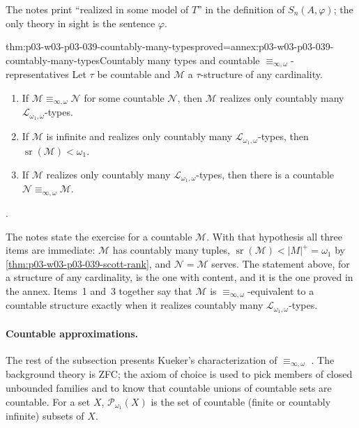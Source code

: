 The notes print ``realized in some model of \(T\)'' in the definition of
\(S_n(A,\varphi)\); the only theory in sight is the sentence \(\varphi\).

\begin{hbtheorem}{thm:p03-w03-p03-039-countably-many-types}{proved=annex:p03-w03-p03-039-countably-many-types}{Countably many types and countable \(\equiv_{\infty,\omega}\)-representatives}
Let \(\tau\) be countable and \(\mathcal M\) a \(\tau\)-structure of any
cardinality.
\begin{enumerate}
\item If \(\mathcal M\equiv_{\infty,\omega}\mathcal N\) for some countable
      \(\mathcal N\), then \(\mathcal M\) realizes only countably many
      \(\mathcal L_{\omega_1,\omega}\)-types.
\item If \(\mathcal M\) is infinite and realizes only countably many
      \(\mathcal L_{\omega_1,\omega}\)-types, then
      \(\operatorname{sr}(\mathcal M)<\omega_1\).
\item If \(\mathcal M\) realizes only countably many
      \(\mathcal L_{\omega_1,\omega}\)-types, then there is a countable
      \(\mathcal N\equiv_{\infty,\omega}\mathcal M\).
\end{enumerate}
\cite[Ex.~2.34, p.~22]{Marker2014InfinitaryNotes}.
\end{hbtheorem}

The notes state the exercise for a countable \(\mathcal M\). With that
hypothesis all three items are immediate: \(\mathcal M\) has countably many
tuples, \(\operatorname{sr}(\mathcal M)<\lvert M\rvert^+=\omega_1\) by
\cref{thm:p03-w03-p03-039-scott-rank}, and \(\mathcal N=\mathcal M\) serves.
The statement above, for a structure of any cardinality, is the one with
content, and it is the one proved in the annex. Items~1 and~3 together say
that \(\mathcal M\) is \(\equiv_{\infty,\omega}\)-equivalent to a countable
structure exactly when it realizes countably many
\(\mathcal L_{\omega_1,\omega}\)-types.

\paragraph{Countable approximations.} The rest of the subsection presents
Kueker's characterization of \(\equiv_{\infty,\omega}\)
\cite[Sec.~2.3, pp.~22--26]{Marker2014InfinitaryNotes}. The background
theory is ZFC; the axiom of choice is used to pick members of closed
unbounded families and to know that countable unions of countable sets are
countable. For a set \(X\), \(\mathcal P_{\omega_1}(X)\) is the set of
countable (finite or countably infinite) subsets of \(X\).

